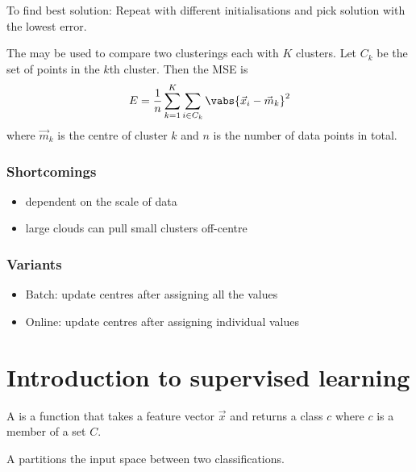 \documentclass{article}
\begin{document}
To find best solution: Repeat with different initialisations and pick solution
with the lowest error.
\begin{definition}
	The  may be used to compare two clusterings
	each with $K$ clusters. Let $C_k$ be the set of points in the $k$th cluster.
	Then the MSE is
	\begin{align*}
		E = \frac{1}{n}\sum_{k=1}^K \sum_{i\in C_k} \vabs{\vec x_i - \vec m_k}^2
	\end{align*}
	where $\vec m_k$ is the centre of cluster $k$ and $n$ is the number of data
	points in total.
\end{definition}

\subsubsection{Shortcomings}

\begin{itemize}
	\item dependent on the scale of data
	\item large clouds can pull small clusters off-centre
\end{itemize}

\subsubsection{Variants}

\begin{itemize}
	\item Batch: update centres after assigning all the values
	\item Online: update centres after assigning individual values 
\end{itemize}



\section{Introduction to supervised learning}



\begin{definition}
	A  is a function that takes a feature vector $\vec x$
	and returns a class $c$ where $c$ is a member of a set $C$.
\end{definition}
\begin{definition}
	A  partitions the input space between two
	classifications.
\end{definition}
\end{document}

